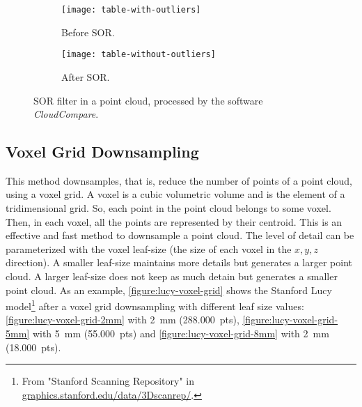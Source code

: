 \begin{figure}[h]
    
    \centering
    \begin{subfigure}[t]{0.5\textwidth}
        
        \centering
        \texttt{[image: table-with-outliers]}
        \caption{Before SOR.}
        \label{figure:sor-filter-before}
    \end{subfigure}%
    \begin{subfigure}[t]{0.5\textwidth}
        \centering
        \texttt{[image: table-without-outliers]}
        \caption{After SOR.}
        \label{figure:sor-filter-after}
    \end{subfigure}

    \caption{SOR filter in a point cloud, processed by the software \textit{CloudCompare}.}
    \label{figure:sor-filter}
\end{figure}

\subsection{Voxel Grid Downsampling}

This method downsamples, that is, reduce the number of points of a point cloud, using a voxel grid. A voxel is a cubic volumetric volume and is the element of a tridimensional grid. So, each point in the point cloud belongs to some voxel. Then, in each voxel, all the points are represented by their centroid. This is an effective and fast method to downsample a point cloud. The level of detail can be parameterized with the voxel leaf-size (the size of each voxel in the $x,y,z$ direction). A smaller leaf-size maintains more details but generates a larger point cloud. A larger leaf-size does not keep as much detain but generates a smaller point cloud. As an example, \cref{figure:lucy-voxel-grid} shows the Stanford Lucy model\footnote{From "Stanford Scanning Repository" in \url{graphics.stanford.edu/data/3Dscanrep/}.} after a voxel grid downsampling with different leaf size values: \cref{figure:lucy-voxel-grid-2mm} with \SI{2}{\milli\meter} (288.000~pts), \cref{figure:lucy-voxel-grid-5mm} with \SI{5}{\milli\meter} (55.000~pts) and \cref{figure:lucy-voxel-grid-8mm} with \SI{2}{\milli\meter} (18.000~pts).

